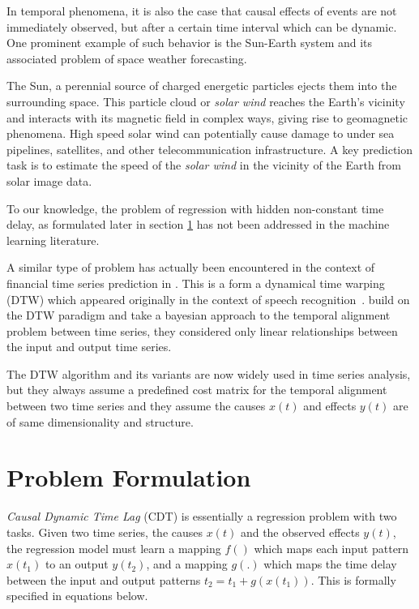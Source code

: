 \documentclass[twoside]{article}
\begin{document}
In temporal phenomena, it is also the case that causal effects of events are not immediately observed, but after a certain time interval which can be dynamic. One prominent example of such behavior is the Sun-Earth system and its associated problem of space weather forecasting.

The Sun, a perennial source of charged energetic particles ejects them into the surrounding space. This particle cloud or \emph{solar wind} reaches the Earth's vicinity and interacts with its magnetic field in complex ways, giving rise to geomagnetic phenomena. High speed solar wind can potentially cause damage to under sea pipelines, satellites, and other telecommunication infrastructure. A key prediction task is to estimate the speed of the \emph{solar wind} in the vicinity of the Earth from solar image data.   
 
To our knowledge, the problem of regression with hidden non-constant time delay, as formulated later in section \ref{sec:formulation} has not been addressed in the machine learning literature. 

A similar type of problem has actually been encountered in the context of financial time series prediction in \cite{ZHOU2006195}. This is a form a dynamical time warping (DTW) which appeared originally in the context of speech recognition~\cite{SakoeShiba1978}. \cite{SignalDiffusion} build on the DTW paradigm and take a bayesian approach to the temporal alignment problem between time series, they considered only linear relationships between the input and output time series.

The DTW algorithm and its variants are now widely used in time series analysis, but they always assume a predefined cost matrix for the temporal alignment between two time series and they assume the causes $x(t)$ and effects $y(t)$ are of same dimensionality and structure. 




\section{Problem Formulation}\label{sec:formulation}

\emph{Causal Dynamic Time Lag} (CDT) is essentially a regression problem with two tasks. Given two time series, the causes $x(t)$ and the observed effects $y(t)$, the regression model must learn a mapping $f()$ which maps each input pattern $x(t_1)$ to an output $y(t_2)$, and a mapping $g(.)$ which maps the time delay between the input and output patterns $t_2 = t_1 + g(x(t_1))$. This is formally specified in equations below.
\end{document}
